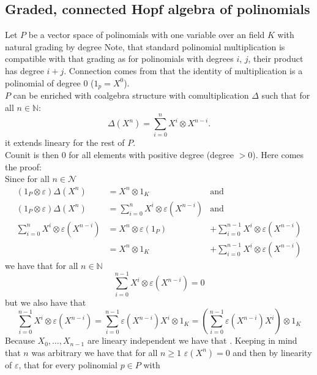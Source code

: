 \documentclass[a4paper, 12pt]{report}
\begin{document}
\subsection{Graded, connected Hopf algebra of polinomials}
Let $P$ be a vector space of polinomials with one variable over an field $K$ with natural grading by degree
Note, that standard polinomial multiplication is compatible with that grading as for polinomials with
degrees $i$, $j$, their product has degree $i + j$. Connection comes from that the identity of
multiplication
is a polinomial of degree $0$ ($1_p = X^0$).  \\
$P$ can be enriched with coalgebra structure with comultiplication $\Delta$ such that for all
$n \in \mathbb{N}$:
\begin{equation*}
\Delta(X^n) = \sum^n_{i = 0} X^i \otimes X^{n-i}.
\end{equation*}
it extends lineary for the rest of $P$. \\
Counit is then $0$ for all elements with positive degree (degree $>0$). Here comes the proof: \\
Since for all $n \in \mathcal{N}$
\begin{align*}
(1_P \otimes \varepsilon )\Delta(X^n) &= X^n \otimes 1_K &\mathrm{and} \\
(1_P \otimes \varepsilon )\Delta(X^n) &= \sum^n_{i = 0} X^i \otimes \varepsilon(X^{n-i}) &\mathrm{and} \\
\sum^n_{i = 0} X^i \otimes \varepsilon(X^{n-i}) &= X^n \otimes \varepsilon(1_P) &+
\sum^{n-1}_{i=0} X^i \otimes \varepsilon(X^{n-i}) \\ &=
X^n \otimes 1_K &+ \sum^{n-1}_{i=0} X^i \otimes \varepsilon(X^{n-i})
\end{align*}
we have that for all $n \in \mathbb{N}$
\begin{equation*}
\sum^{n-1}_{i=0} X^i \otimes \varepsilon(X^{n-i}) = 0
\end{equation*}
but we also have that
\begin{equation*}
\sum^{n-1}_{i=0} X^i \otimes \varepsilon(X^{n-i}) = \sum^{n-1}_{i=0} \varepsilon(X^{n-i})X^i \otimes 1_K =
\left( \sum^{n-1}_{i=0} \varepsilon(X^{n-i})X^i \right)\otimes 1_K
\end{equation*}
Because $X_0, \dots, X_{n-1}$ are lineary independent we have that . Keeping in mind that $n$ was arbitrary we have that for all $n \geq 1$
$\varepsilon(X^n) = 0$ and then by linearity of $\varepsilon$, that for every polinomial $p \in P$ with
\end{document}
